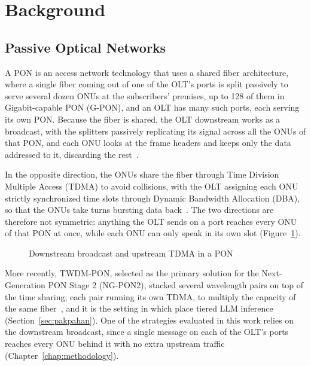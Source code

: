 \documentclass[cic,dipl,english]{infufrgs}
\begin{document}
\section{Background}
\label{sec:background}

\subsection{Passive Optical Networks}
\label{sec:pon}
A PON is an access network technology that uses a shared fiber architecture, where a
single fiber coming out of one of the OLT's ports is split passively to serve several
dozen ONUs at the subscribers' premises, up to 128 of them in Gigabit-capable PON
(G-PON), and an OLT has many such ports, each serving its own PON. Because the fiber is
shared, the OLT downstream works as a broadcast, with the splitters passively
replicating its signal across all the ONUs of that PON, and each ONU looks at the
frame headers and keeps only the data addressed to it, discarding the
rest~\cite{effenberger2007introduction}.

In the opposite direction, the ONUs share the fiber through Time Division Multiple
Access (TDMA) to avoid collisions, with the OLT assigning each ONU strictly synchronized
time slots through Dynamic Bandwidth Allocation (DBA), so that the ONUs take turns
bursting data back~\cite{effenberger2007introduction}. The two directions are therefore
not symmetric: anything the OLT sends on a port reaches every ONU of that PON at once,
while each ONU can only speak in its own slot (Figure~\ref{fig:pon}).

\begin{figure}[htb]
  \centering
  \caption{Downstream broadcast and upstream TDMA in a PON}
  \label{fig:pon}
  \vspace{6pt}
  
\end{figure}

More recently, TWDM-PON, selected as the primary solution for the Next-Generation PON Stage 2 (NG-PON2), stacked several wavelength pairs on
top of the time sharing, each pair running its own TDMA, to multiply the capacity of the
same fiber~\cite{luo2013twdm}, and it is the setting in which
 place tiered LLM inference
(Section~\ref{sec:pakpahan}). One of the strategies evaluated in this work relies on
the downstream broadcast, since a single message on each of the OLT's ports reaches every
ONU behind it with no extra upstream traffic (Chapter~\ref{chap:methodology}).
\end{document}
